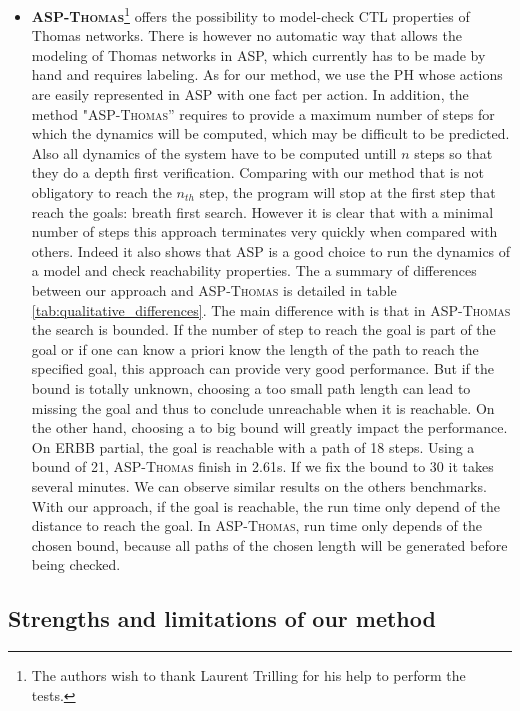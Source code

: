 \begin{itemize}[leftmargin=*]
\item \textbf{\textsc{ASP-Thomas}}\footnote{The authors wish to thank Laurent Trilling for his help to perform the tests.}
offers the possibility to model-check CTL properties of Thomas networks. 
There is however no automatic way that allows the modeling of Thomas networks in ASP, which currently has to be made by hand and requires labeling. As for our method, we use the PH whose actions are easily represented in ASP with one fact per action.
In addition, the method "\textsc{ASP-Thomas}'' requires to provide a maximum number of steps
for which the dynamics will be computed, which may be difficult to be predicted. Also all dynamics of the system have to be computed untill $n$ steps so that they do a depth first verification. Comparing with our method that is not obligatory to reach the $n_{th}$ step, the program will stop at the first step that reach the goals: breath first search.
However it is clear that with a minimal number of steps this approach terminates very quickly when compared with others.
Indeed it also shows that ASP is a good choice to run the dynamics of a model and check reachability properties.
The a summary of differences between our approach and \textsc{ASP-Thomas} is detailed in table \ref{tab:qualitative_differences}.
	The main difference with is that in \textsc{ASP-Thomas} the search is bounded.
	If the number of step to reach the goal is part of the goal or if one can know a priori know the length of the path to reach the specified goal,
	this approach can provide very good performance.
	But if the bound is totally unknown, choosing a too small path length can lead to missing the goal and thus to conclude unreachable when it is reachable.
	On the other hand, choosing a to big bound will greatly impact the performance.
	On ERBB partial, the goal is reachable with a path of 18 steps.
	Using a bound of 21, \textsc{ASP-Thomas} finish in 2.61s.
	If we fix the bound to 30 it takes several minutes.
	We can observe similar results on the others benchmarks.
	With our approach, if the goal is reachable, the run time only depend of the distance to reach the goal.
	In \textsc{ASP-Thomas}, run time only depends of the chosen bound, because all paths of the chosen length will be generated before being checked.
	

\end{itemize}

\subsection{Strengths and limitations of our method}
\label{sec:limitations}

